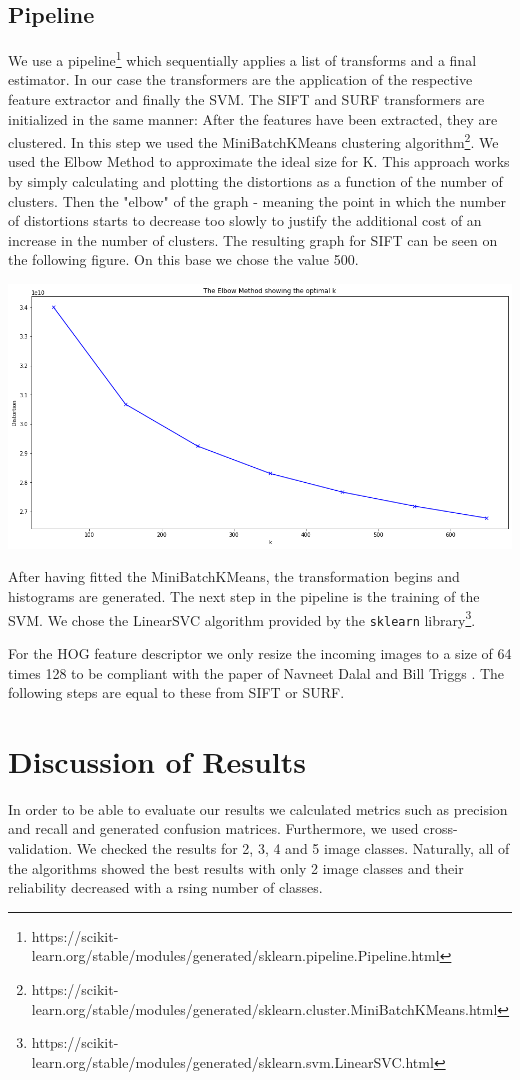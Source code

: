 \documentclass{scrartcl}
\begin{document}
\subsection{Pipeline}
We use a pipeline\footnote{https://scikit-learn.org/stable/modules/generated/sklearn.pipeline.Pipeline.html} which sequentially applies a list of transforms and a final estimator.
In our case the transformers are the application of the respective feature extractor and finally the SVM.
The SIFT and SURF transformers are initialized in the same manner: After the features have been extracted, they are clustered.
In this step we used the MiniBatchKMeans clustering algorithm\footnote{https://scikit-learn.org/stable/modules/generated/sklearn.cluster.MiniBatchKMeans.html}. We used the Elbow Method to approximate the ideal size for K.
This approach works by simply calculating and plotting the distortions as a function of the number of clusters. Then the "elbow" of the graph - meaning the point in which the number of distortions starts to decrease too slowly to justify the additional cost of an increase in the number of clusters. The resulting graph for SIFT can be seen on the following figure. On this base we chose the value 500.
\begin{center}
  \includegraphics[scale=0.3]{img/kmeans-sift}
\end{center}
After having fitted the MiniBatchKMeans, the transformation begins and histograms are generated.
The next step in the pipeline is the training of the SVM. We chose the LinearSVC algorithm provided by the \texttt{sklearn} library\footnote{https://scikit-learn.org/stable/modules/generated/sklearn.svm.LinearSVC.html}.

For the HOG feature descriptor we only resize the incoming images to a size of 64 times 128 to be compliant with the paper of Navneet Dalal and Bill Triggs \cite{Hog_article}. The following steps are equal to these from SIFT or SURF.

\section{Discussion of Results}
In order to be able to evaluate our results we calculated metrics such as precision and recall and generated confusion matrices.
Furthermore, we used cross-validation. We checked the results for 2, 3, 4 and 5 image classes.
Naturally, all of the algorithms showed the best results with only 2 image classes and their reliability decreased with a rsing number of classes.


\end{document}
